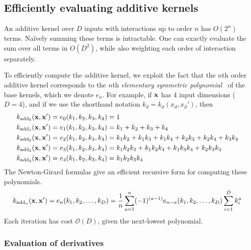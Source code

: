 \subsection{Efficiently evaluating additive kernels}
An additive kernel over $D$ inputs with interactions up to order $n$ has $O(2^n)$ terms.
Na\"{i}vely summing these terms is intractable.
One can exactly evaluate the sum over all terms in $O(D^2)$, while also weighting each order of interaction separately.

To efficiently compute the additive kernel, we exploit the fact that the $n$th order additive kernel corresponds to the $n$th \textit{elementary symmetric polynomial}~\citep{macdonald1998symmetric}
of the base kernels, which we denote $e_n$.
For example, if ${\bf{x}}$ has 4 input dimensions ($D = 4$), and if we use the shorthand notation $k_d = k_d(x_d, x_d')$, then
%
\begin{align}
k_{\textnormal{add}_0}({\bf x, x'}) & = e_0( k_1, k_2, k_3, k_4 ) = 1 \\
k_{\textnormal{add}_1}({\bf x, x'}) & = e_1( k_1, k_2, k_3, k_4 ) = k_1 + k_2 + k_3 + k_4 \\
k_{\textnormal{add}_2}({\bf x, x'}) & = e_2( k_1, k_2, k_3, k_4 ) = k_1 k_2 + k_1 k_3 + k_1k_4 + k_2 k_3 + k_2 k_4 + k_3 k_4 \\
k_{\textnormal{add}_3}({\bf x, x'}) & = e_3( k_1, k_2, k_3, k_4 ) = k_1 k_2 k_3 + k_1 k_2 k_4 + k_1 k_3 k_4 + k_2 k_3 k_4 \\
k_{\textnormal{add}_4}({\bf x, x'}) & = e_4( k_1, k_2, k_3, k_4 ) = k_1 k_2 k_3 k_4
\end{align}
%
The Newton-Girard formulas give an efficient recursive form for computing these polynomials.
%
\begin{align}
k_{\textnormal{add}_n}({\bf x, x'}) = e_n(k_1,k_2,\dots,k_D) = \frac{1}{n} \sum_{a=1}^n (-1)^{(a-1)} e_{n-a}(k_1, k_2, \dots,k_D)  \sum_{i=1}^Dk_i^a
\end{align}
%
Each iteration has cost $\mathcal{O}(D)$, given the next-lowest polynomial.


\subsubsection{Evaluation of derivatives}

